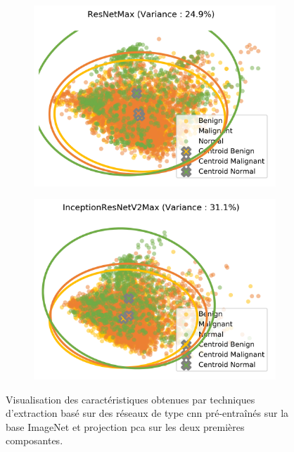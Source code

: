 \begin{figure}[H]
\begin{subfigure}{.2\textwidth}
      \includegraphics[width=\textwidth]{contents/chapter_4/resources/visualisation_transfer_ResNetMax.png}
    \end{subfigure}
    \begin{subfigure}{.2\textwidth}
      \includegraphics[width=\textwidth]{contents/chapter_4/resources/visualisation_transfer_InceptionResNetV2Max.png}
    \end{subfigure}
    
    \caption{Visualisation des caractéristiques obtenues par techniques d'extraction basé sur des réseaux de type \gls{cnn} pré-entraînés sur la base ImageNet et projection \gls{pca} sur les deux premières composantes.}
    \label{fig:visualisation_transfer}
\end{figure}\par

